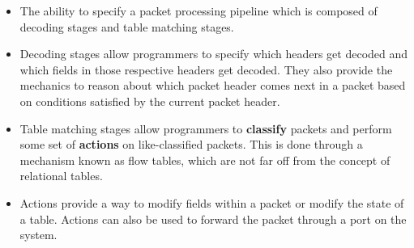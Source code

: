 \begin{itemize}
\item The ability to specify a packet processing pipeline which is composed of decoding stages and table matching stages.

\item Decoding stages allow programmers to specify which headers get decoded and which fields in those respective headers get decoded. They also provide the mechanics to reason about which packet header comes next in a packet based on conditions satisfied by the current packet header.

\item 
Table matching stages allow programmers to \textbf{classify} packets and perform some set of \textbf{actions} on like-classified packets. This is done through a mechanism known as flow tables, which are not far off from the concept of relational tables.

\item
Actions provide a way to modify fields within a packet or modify the state of a table. Actions can also be used to forward the packet through a port on the system.

\end{itemize}
